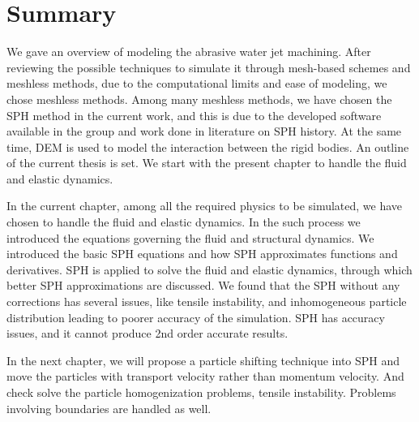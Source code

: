 \section{Summary}
We gave an overview of modeling the abrasive water jet machining. After
reviewing the possible techniques to simulate it through mesh-based schemes and
meshless methods, due to the computational limits and ease of modeling, we chose
meshless methods. Among many meshless methods, we have chosen the SPH method in
the current work, and this is due to the developed software available in the
group and work done in literature on SPH history. At the same time, DEM is used
to model the interaction between the rigid bodies. An outline of the current
thesis is set. We start with the present chapter to handle the fluid and elastic
dynamics.

In the current chapter, among all the required physics to be simulated, we have
chosen to handle the fluid and elastic dynamics. In the such process we
introduced the equations governing the fluid and structural dynamics. We
introduced the basic SPH equations and how SPH approximates functions and
derivatives. SPH is applied to solve the fluid and elastic dynamics, through
which better SPH approximations are discussed. We found that the SPH without any
corrections has several issues, like tensile instability, and inhomogeneous
particle distribution leading to poorer accuracy of the simulation. SPH has
accuracy issues, and it cannot produce 2nd order accurate results.

In the next chapter, we will propose a particle shifting technique into SPH and
move the particles with transport velocity rather than momentum velocity. And
check solve the particle homogenization problems, tensile instability. Problems
involving boundaries are handled as well.


